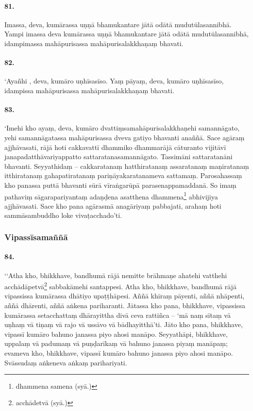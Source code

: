 \paragraph{81.} Imassa, deva, kumārassa uṇṇā bhamukantare jātā odātā mudutūlasannibhā. Yampi imassa deva kumārassa uṇṇā bhamukantare jātā odātā mudutūlasannibhā, idampimassa mahāpurisassa mahāpurisalakkhaṇaṃ bhavati.

\paragraph{82.} ‘Ayañhi , deva, kumāro uṇhīsasīso. Yaṃ pāyaṃ, deva, kumāro uṇhīsasīso, idampissa mahāpurisassa mahāpurisalakkhaṇaṃ bhavati.

\paragraph{83.} ‘Imehi kho ayaṃ, deva, kumāro dvattiṃsamahāpurisalakkhaṇehi samannāgato, yehi samannāgatassa mahāpurisassa dveva gatiyo bhavanti anaññā. Sace agāraṃ ajjhāvasati, rājā hoti cakkavattī dhammiko dhammarājā cāturanto vijitāvī janapadatthāvariyappatto sattaratanasamannāgato. Tassimāni sattaratanāni bhavanti. Seyyathidaṃ – cakkaratanaṃ hatthiratanaṃ assaratanaṃ maṇiratanaṃ itthiratanaṃ gahapatiratanaṃ pariṇāyakaratanameva sattamaṃ. Parosahassaṃ kho panassa puttā bhavanti sūrā vīraṅgarūpā parasenappamaddanā. So imaṃ pathaviṃ sāgarapariyantaṃ adaṇḍena asatthena dhammena\footnote{dhammena samena (syā.)} abhivijiya ajjhāvasati. Sace kho pana agārasmā anagāriyaṃ pabbajati, arahaṃ hoti sammāsambuddho loke vivaṭacchado’ti.

\subsubsection{Vipassīsamaññā}

\paragraph{84.} ‘‘Atha kho, bhikkhave, bandhumā rājā nemitte brāhmaṇe ahatehi vatthehi acchādāpetvā\footnote{acchādetvā (syā.)} sabbakāmehi santappesi. Atha kho, bhikkhave, bandhumā rājā vipassissa kumārassa dhātiyo upaṭṭhāpesi. Aññā khīraṃ pāyenti, aññā nhāpenti, aññā dhārenti, aññā aṅkena pariharanti. Jātassa kho pana, bhikkhave, vipassissa kumārassa setacchattaṃ dhārayittha divā ceva rattiñca – ‘mā naṃ sītaṃ vā uṇhaṃ vā tiṇaṃ vā rajo vā ussāvo vā bādhayitthā’ti. Jāto kho pana, bhikkhave, vipassī kumāro bahuno janassa piyo ahosi manāpo. Seyyathāpi, bhikkhave, uppalaṃ vā padumaṃ vā puṇḍarīkaṃ vā bahuno janassa piyaṃ manāpaṃ; evameva kho, bhikkhave, vipassī kumāro bahuno janassa piyo ahosi manāpo. Svāssudaṃ aṅkeneva aṅkaṃ parihariyati.

